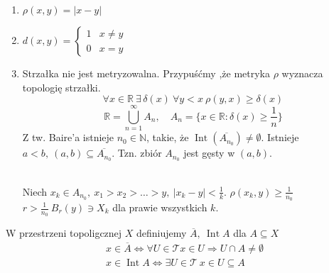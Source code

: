 \begin{przy} \hfill
    \begin{enumerate}[(1)]
        \item $\rho (x,y) = |x-y|$
        \item $d(x,y) = \begin{cases} 1 & x \neq y \\ 0 &x = y \end{cases}$
        \item Strzałka nie jest metryzowalna. Przypuśćmy ,że metryka $\rho$ wyznacza topologię strzałki. 
            \[ \forall x \in \mathbb R \ \exists \, \delta(x) \ \forall y < x \ \rho (y,x) \ge \delta (x)\]
            \[ \mathbb R = \bigcup^\infty_{n=1} A_n, \quad A_n = \{ x \in \mathbb R : \delta(x) \ge \frac{1}{n} \} \]
            Z tw. Baire'a istnieje $n_0 \in \mathbb N$, takie, że $\operatorname{Int}(\overline{A_{n_0}}) \neq 
            \emptyset$. Istnieje $a < b, \ (a,b) \subseteq \overline{A_{n_0}}$. Tzn. zbiór 
            $A_{n_0}$ jest gęsty w $(a,b)$.\\[1cm]
             \\[1cm] 
            Niech $x_k \in A_{n_0},\ x_1 > x_2 > \ldots > y,\ |x_k - y| < \frac{1}{k}$. 
            $\rho(x_k,y) \ge \frac{1}{n_0}$ \\ 
            $r > \frac{1}{n_0} \ B_r (y) \ni X_k$ dla prawie wszystkich $k$.
    \end{enumerate} 
\end{przy} 
\begin{df} 
    W przestrzeni topoligcznej $X$ definiujemy $\overline A,\ \operatorname{Int} A$ dla $A \subseteq X$
    \begin{gather*} 
        x \in \overline A \Leftrightarrow \forall U \in \mathcal T x \in U \Rightarrow U \cap A \neq \emptyset \\ 
        x \in \operatorname{Int} A \Leftrightarrow \exists U \in \mathcal T \ x \in U \subseteq A
    \end{gather*} 
\end{df} 
